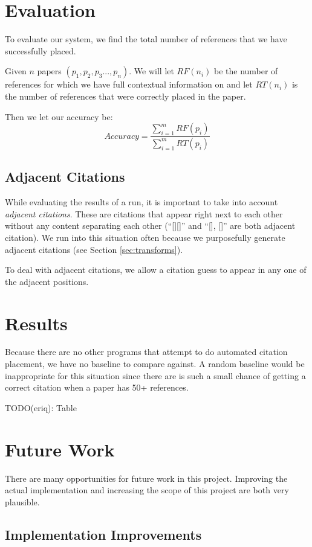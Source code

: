 \documentclass[10pt, conference, compsocconf]{IEEEtran}
\begin{document}
\section{Evaluation}
To evaluate our system, we find the total number of references that we have successfully placed.

Given $n$ papers $(p_{1}, p_{2}, p_{3} ..., p_{n})$. We will let $RF(n_{i})$ be the number of references
for which we have full contextual information on and let $RT(n_{i})$ is the number of references
that were correctly placed in the paper.

Then we let our accuracy be:
$$Accuracy = \frac{\sum_{i = 1}^{m} RF(p_{i})}{\sum_{i = 1}^{m} RT(p_{i})}$$

\subsection{Adjacent Citations}
While evaluating the results of a run, it is important to take into account \textit{adjacent citations}.
These are citations that appear right next to each other without any content separating each other (``[][]'' and ``[], []''
are both adjacent citation). We run into this situation often because we purposefully generate adjacent citations (see
Section \ref{sec:transforms}).

To deal with adjacent citations, we allow a citation guess to appear in any one of the adjacent positions.

\section{Results}\label{sec:results}
Because there are no other programs that attempt to do automated citation placement, we have no baseline to compare against.
A random baseline would be inappropriate for this situation since there are is such a small chance of getting a correct
citation when a paper has 50+ references.

TODO(eriq): Table

\section{Future Work}\label{sec:future}
There are many opportunities for future work in this project.
Improving the actual implementation and increasing the scope of this project are both very plausible.

\subsection{Implementation Improvements}
\end{document}
